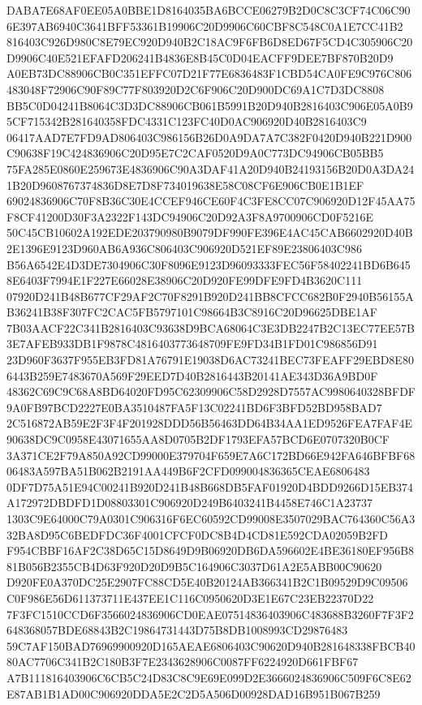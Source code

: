 \documentclass[UTF8,fontset=fandol,zihao=-4,a4paper]{ctexart}
\begin{document}
{{DABA7E68AF0EE05A0BBE1D8164035BA6BCCE06279B2D0C8C3CF74C06C906E397AB6940C3641BFF53361B19906C20D9906C60CBF8C548C0A1E7CC41B2
816403C926D980C8E79EC920D940B2C18AC9F6FB6D8ED67F5CD4C305906C20D9906C40E521EFAFD206241B4836E8B45C0D04EACFF9DEE7BF870B20D9
A0EB73DC88906CB0C351EFFC07D21F77E6836483F1CBD54CA0FE9C976C806483048F72906C90F89C77F803920D2C6F906C20D900DC69A1C7D3DC8808
BB5C0D04241B8064C3D3DC88906CB061B5991B20D940B2816403C906E05A0B95CF715342B281640358FDC4331C123FC40D0AC906920D40B2816403C9
06417AAD7E7FD9AD806403C986156B26D0A9DA7A7C382F0420D940B221D900C90638F19C424836906C20D95E7C2CAF0520D9A0C773DC94906CB05BB5
75FA285E0860E259673E4836906C90A3DAF41A20D940B24193156B20D0A3DA241B20D9608767374836D8E7D8F734019638E58C08CF6E906CB0E1B1EF
69024836906C70F8B36C30E4CCEF946CE60F4C3FE8CC07C906920D12F45AA75F8CF41200D30F3A2322F143DC94906C20D92A3F8A9700906CD0F5216E
50C45CB10602A192EDE203790980B9079DF990FE396E4AC45CAB6602920D40B2E1396E9123D960AB6A936C806403C906920D521EF89E23806403C986
B56A6542E4D3DE7304906C30F8096E9123D96093333FEC56F58402241BD6B6458E6403F7994E1F227E66028E38906C20D920FE99DFE9FD4B3620C111
07920D241B48B677CF29AF2C70F8291B920D241BB8CFCC682B0F2940B56155AB36241B38F307FC2CAC5FB5797101C98664B3C8916C20D96625DBE1AF
7B03AACF22C341B2816403C93638D9BCA68064C3E3DB2247B2C13EC77EE57B3E7AFEB933DB1F9878C4816403773648709FE9FD34B1FD01C986856D91
23D960F3637F955EB3FD81A76791E19038D6AC73241BEC73FEAFF29EBD8E806443B259E7483670A569F29EED7D40B2816443B20141AE343D36A9BD0F
48362C69C9C68A8BD64020FD95C62309906C58D2928D7557AC9980640328BFDF9A0FB97BCD2227E0BA3510487FA5F13C02241BD6F3BFD52BD958BAD7
2C516872AB59E2F3F4F201928DDD56B56463DD64B34AA1ED9526FEA7FAF4E90638DC9C0958E43071655AA8D0705B2DF1793EFA57BCD6E0707320B0CF
3A371CE2F79A850A92CD99000E379704F659E7A6C172BD66E942FA646BFBF6806483A597BA51B062B2191AA449B6F2CFD099004836365CEAE6806483
0DF7D75A51E94C00241B920D241B48B668DB5FAF01920D4BDD9266D15EB374A172972DBDFD1D08803301C906920D249B6403241B4458E746C1A23737
1303C9E64000C79A0301C906316F6EC60592CD99008E3507029BAC764360C56A332BA8D95C6BEDFDC36F4001CFCF0DC8B4D4CD81E592CDA02059B2FD
F954CBBF16AF2C38D65C15D8649D9B06920DB6DA596602E4BE36180EF956B881B056B2355CB4D63F920D20D9B5C164906C3037D61A2E5ABB00C90620
D920FE0A370DC25E2907FC88CD5E40B20124AB366341B2C1B09529D9C09506C0F986E56D611373711E437EE1C116C0950620D3E1E67C23EB22370D22
7F3FC1510CCD6F3566024836906CD0EAE07514836403906C483688B3260F7F3F2648368057BDE68843B2C19864731443D75B8DB1008993CD29876483
59C7AF150BAD76969900920D165AEAE6806403C90620D940B281648338FBCB4080AC7706C341B2C180B3F7E2343628906C0087FF6224920D661FBF67
A7B111816403906C6CB5C24D83C8C9E69E099D2E3666024836906C509F6C8E62E87AB1B1AD00C906920DDA5E2C2D5A506D00928DAD16B951B067B259
}}
\end{document}
